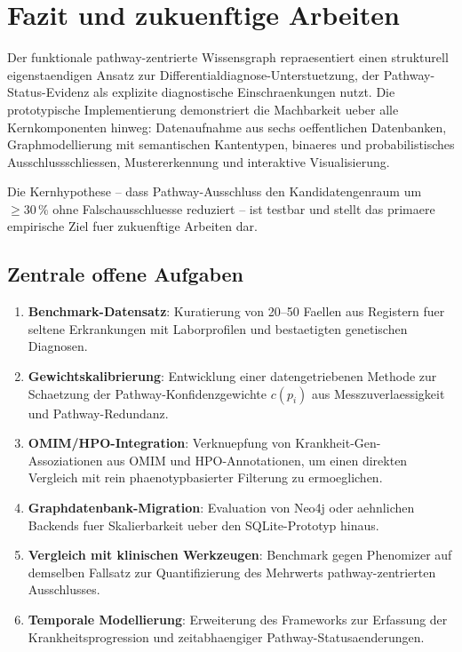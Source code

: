 \documentclass[12pt,a4paper]{article}
\begin{document}
\section{Fazit und zukuenftige Arbeiten}
\label{sec:conclusion}

Der funktionale pathway-zentrierte Wissensgraph repraesentiert einen strukturell eigenstaendigen Ansatz zur Differentialdiagnose-Unterstuetzung, der Pathway-Status-Evidenz als explizite diagnostische Einschraenkungen nutzt. Die prototypische Implementierung demonstriert die Machbarkeit ueber alle Kernkomponenten hinweg: Datenaufnahme aus sechs oeffentlichen Datenbanken, Graphmodellierung mit semantischen Kantentypen, binaeres und probabilistisches Ausschlussschliessen, Mustererkennung und interaktive Visualisierung.

Die Kernhypothese -- dass Pathway-Ausschluss den Kandidatengenraum um $\geq 30\,\%$ ohne Falschausschluesse reduziert -- ist testbar und stellt das primaere empirische Ziel fuer zukuenftige Arbeiten dar.

\subsection{Zentrale offene Aufgaben}

\begin{enumerate}
    \item \textbf{Benchmark-Datensatz}: Kuratierung von 20--50 Faellen aus Registern fuer seltene Erkrankungen mit Laborprofilen und bestaetigten genetischen Diagnosen.
    \item \textbf{Gewichtskalibrierung}: Entwicklung einer datengetriebenen Methode zur Schaetzung der Pathway-Konfidenzgewichte $c(p_i)$ aus Messzuverlaessigkeit und Pathway-Redundanz.
    \item \textbf{OMIM/HPO-Integration}: Verknuepfung von Krankheit-Gen-Assoziationen aus OMIM und HPO-Annotationen, um einen direkten Vergleich mit rein phaenotypbasierter Filterung zu ermoeglichen.
    \item \textbf{Graphdatenbank-Migration}: Evaluation von Neo4j oder aehnlichen Backends fuer Skalierbarkeit ueber den SQLite-Prototyp hinaus.
    \item \textbf{Vergleich mit klinischen Werkzeugen}: Benchmark gegen Phenomizer auf demselben Fallsatz zur Quantifizierung des Mehrwerts pathway-zentrierten Ausschlusses.
    \item \textbf{Temporale Modellierung}: Erweiterung des Frameworks zur Erfassung der Krankheitsprogression und zeitabhaengiger Pathway-Statusaenderungen.
\end{enumerate}
\end{document}
